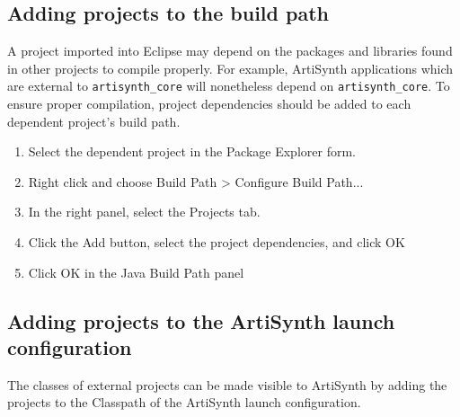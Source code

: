 \subsection{Adding projects to the build path}
\label{AddingProjectsToBuildPath}

A project imported into Eclipse may depend on the packages and
libraries found in other projects to compile properly.  For example,
ArtiSynth applications which are external to {\tt artisynth\_core}
will nonetheless depend on {\tt artisynth\_core}. To ensure
proper compilation, project dependencies should be added
to each dependent project's build path.

\begin{enumerate}

\item Select the dependent project in the {\sf Package Explorer} form.

\item Right click and choose {\sf Build Path > Configure Build Path...} 

\item In the right panel, select the {\sf Projects} tab.

\item Click the {\sf Add} button, select the project dependencies,
      and click {\sf OK}

\item Click {\sf OK} in the Java Build Path panel

\end{enumerate}

\subsection{Adding projects to the ArtiSynth launch configuration}
\label{AddingProjectsToLaunch}

The classes of external projects can be made visible to ArtiSynth by
adding the projects to the Classpath of the ArtiSynth launch
configuration.

